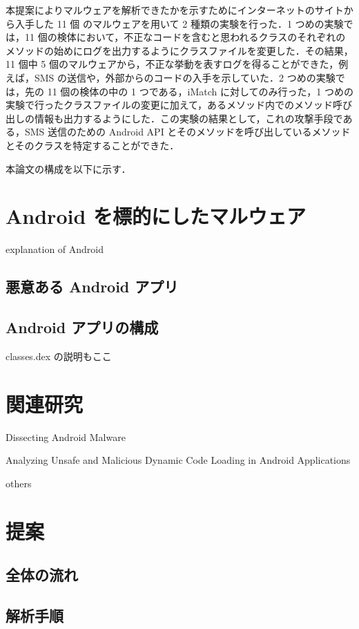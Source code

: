 \documentclass[10pt]{jsarticle}
\begin{document}
本提案によりマルウェアを解析できたかを示すためにインターネットのサイトから入手した 11 個 のマルウェアを用いて 2 種類の実験を行った．1 つめの実験では，11 個の検体において，不正なコードを含むと思われるクラスのそれぞれのメソッドの始めにログを出力するようにクラスファイルを変更した．その結果，11 個中 5 個のマルウェアから，不正な挙動を表すログを得ることができた，例えば，SMS の送信や，外部からのコードの入手を示していた．2 つめの実験では，先の 11 個の検体の中の 1 つである，iMatch に対してのみ行った，1 つめの実験で行ったクラスファイルの変更に加えて，あるメソッド内でのメソッド呼び出しの情報も出力するようにした．この実験の結果として，これの攻撃手段である，SMS 送信のための Android API とそのメソッドを呼び出しているメソッドとそのクラスを特定することができた．

本論文の構成を以下に示す．


\newpage

\section{Android  を標的にしたマルウェア}
explanation of Android
\subsection{悪意ある Android  アプリ}

\subsection{Android アプリの構成}
classes.dex の説明もここ

\newpage
\section{関連研究}

Dissecting Android Malware

Analyzing Unsafe and Malicious Dynamic Code Loading in Android Applications

others

\newpage
\section{提案}

\subsection{全体の流れ}

\subsection{解析手順}
\end{document}
